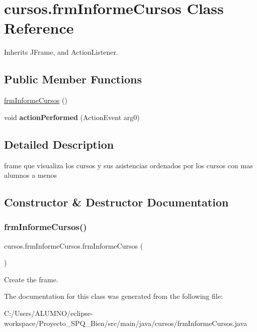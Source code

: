 \hypertarget{classcursos_1_1frm_informe_cursos}{}\section{cursos.\+frm\+Informe\+Cursos Class Reference}
\label{classcursos_1_1frm_informe_cursos}


Inherits J\+Frame, and Action\+Listener.

\subsection*{Public Member Functions}
\begin{DoxyCompactItemize}
\item 
\hyperlink{classcursos_1_1frm_informe_cursos_a3211df8655d635dbb487000136798442}{frm\+Informe\+Cursos} ()
\item 
\mbox{\label{classcursos_1_1frm_informe_cursos_ab5825d718024bd345837b8c67914a828}} 
void {\bfseries action\+Performed} (Action\+Event arg0)
\end{DoxyCompactItemize}


\subsection{Detailed Description}
frame que visualiza los cursos y sus asistencias ordenados por los cursos con mas alumnos a menos 

\subsection{Constructor \& Destructor Documentation}
\mbox{\label{classcursos_1_1frm_informe_cursos_a3211df8655d635dbb487000136798442}} 
\subsubsection{\texorpdfstring{frm\+Informe\+Cursos()}{frmInformeCursos()}}
{\footnotesize\ttfamily cursos.\+frm\+Informe\+Cursos.\+frm\+Informe\+Cursos (\begin{DoxyParamCaption}{ }\end{DoxyParamCaption})}

Create the frame. 

The documentation for this class was generated from the following file\+:\begin{DoxyCompactItemize}
\item 
C\+:/\+Users/\+A\+L\+U\+M\+N\+O/eclipse-\/workspace/\+Proyecto\+\_\+\+S\+P\+Q\+\_\+Bien/src/main/java/cursos/frm\+Informe\+Cursos.\+java\end{DoxyCompactItemize}
